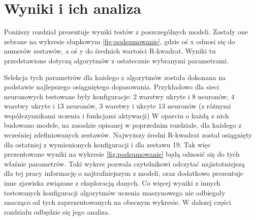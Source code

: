 \chapter{Wyniki i ich analiza }
Poniższy rozdział prezentuje wyniki testów z poszczególnych modeli. Zostały one zebrane na wykresie słupkowym \ref{fig:podsumowanie}, gdzie oś x odnosi się do numerów zestawów, a oś y do średnich wartości R-kwadrat. Wyniki tu przedstawione dotyczą algorytmów z ostatecznie wybranymi parametrami. 

Selekcja tych parametrów dla  każdego z algorytmów została dokonana na podstawie najlepszego osiągniętego dopasowania. Przykładowo dla  sieci neuronowych testowane były konfiguracje: 2 warstwy ukryte i 8 neuronów, 4 warstwy ukryte i 13 neuronów, 3 warstwy i ukryte 13 neuronów (z różnymi współczynnikami uczenia i funkcjami aktywacji) W oparciu o każdą z nich budowano modele, na zasadzie opisanej w poprzednim rozdziale,  dla każdego z wcześniej zdefiniowanych zestawów.  Najwyższy średni R-kwadrat został osiągnięty dla ostatniej z wymienionych konfiguracji i dla zestawu 19. Tak więc prezentowane wyniki na wykresie  \ref{fig:podsumowanie} będą odnosić się do tych właśnie parametrów. Taki wykres pozwala czytelnikowi odczytać najistotniejszą dla tej pracy informację o najtrafniejszym z modeli, oraz dodatkowo prezentuje inne zjawiska związane z eksploracją danych. Co więcej wyniki z innych testowanych konfiguracji algorytmów uczenia maszynowego nie odbiegały znacząco od tych zaprezentowanych na obecnym wykresie. W dalszej części rozdziału  odbędzie się jego analiza.
 
    



